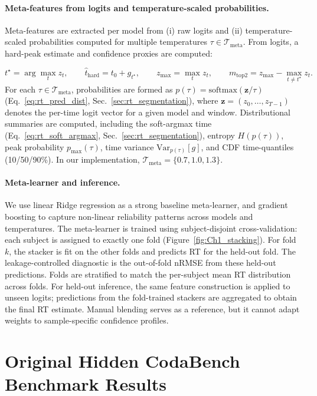 \documentclass[12pt]{article}
\begin{document}
\paragraph{Meta-features from logits and temperature-scaled probabilities.}
Meta-features are extracted per model from (i) raw logits and (ii) temperature-scaled probabilities computed for multiple
temperatures $\tau\in\mathcal{T}_{\text{meta}}$. From logits, a hard-peak estimate and confidence proxies are computed:

\begin{equation}
\label{eq:rt_stacking_logit_features}
t^\star = \arg\max_{t} z_t,\qquad
\hat t_{\mathrm{hard}} = t_0 + g_{t^\star},\qquad
z_{\max} = \max_t z_t,\qquad
m_{\mathrm{top2}} = z_{\max} - \max_{t\neq t^\star} z_t.
\end{equation}
For each $\tau\in\mathcal{T}_{\text{meta}}$, probabilities are formed as $p(\tau)=\mathrm{softmax}(\mathbf{z}/\tau)$ (Eq.~\ref{eq:rt_pred_dist}, Sec.~\ref{sec:rt_segmentation}), where $\mathbf{z}=(z_0,\dots,z_{T-1})$ denotes the per-time logit vector for a given model and window. Distributional summaries
are computed, including the soft-argmax time (Eq.~\ref{eq:rt_soft_argmax}, Sec.~\ref{sec:rt_segmentation}), entropy $H(p(\tau))$, peak probability
$p_{\max}(\tau)$, time variance $\mathrm{Var}_{p(\tau)}[g]$, and CDF time-quantiles (10/50/90\%). In our implementation,
$\mathcal{T}_{\text{meta}}=\{0.7,1.0,1.3\}$.

\paragraph{Meta-learner and inference.}
We use linear Ridge regression as a strong baseline meta-learner, and gradient boosting to capture non-linear reliability
patterns across models and temperatures. The meta-learner is trained using subject-disjoint cross-validation: each subject is assigned to exactly one fold (Figure~\ref{fig:Ch1_stacking}). For fold $k$, the stacker is fit on the other folds and predicts RT for the held-out fold. The leakage-controlled diagnostic is the out-of-fold nRMSE from these held-out predictions. Folds are stratified to match the per-subject mean RT distribution across folds. For held-out inference, the same feature construction is applied to unseen logits; predictions from the fold-trained stackers are aggregated to obtain the final RT estimate.
Manual blending serves as a reference, but it cannot adapt weights to sample-specific confidence profiles.

\section{Original Hidden CodaBench Benchmark Results}
\end{document}
